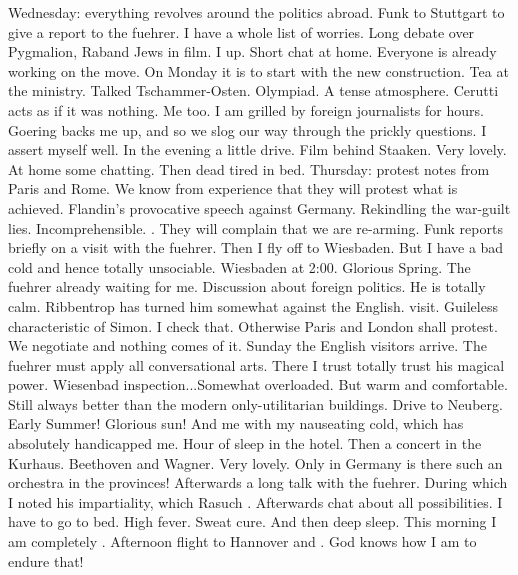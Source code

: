 Wednesday: everything revolves around the politics abroad. Funk to Stuttgart to give a report to the fuehrer. I have a whole list of worries. Long debate over Pygmalion, Rab\missing and Jews in film. I \missing up. Short chat at home. Everyone is already working on the move. On Monday it is to start with the new construction. Tea at the ministry. Talked Tschammer-Osten. Olympiad. A tense atmosphere. Cerutti acts as if it was nothing. Me too. I am grilled by foreign journalists for hours. Goering backs me up, and so we slog our way through the prickly questions. I assert myself well. In the evening a little drive. Film behind Staaken. Very lovely. At home some chatting. Then dead tired in bed.
Thursday: protest notes from Paris and Rome. We know from experience that they will protest what is achieved. Flandin's provocative speech against Germany. Rekindling the war-guilt lies. Incomprehensible. . They will complain that we are re-arming. Funk reports briefly on a visit with the fuehrer. Then I fly off to Wiesbaden. But I have a bad cold and hence totally unsociable. Wiesbaden at 2:00. Glorious Spring. The fuehrer already waiting for me. Discussion about foreign politics. He is totally calm. Ribbentrop has turned him somewhat against the English. visit. Guileless characteristic of Simon. I check that. Otherwise Paris and London shall protest. We negotiate and nothing comes of it. Sunday the English visitors arrive. The fuehrer must apply all conversational arts. There I trust totally trust his magical power. Wiesenbad inspection...Somewhat overloaded. But warm and comfortable. Still always better than the modern only-utilitarian buildings. Drive to Neuberg. Early Summer! Glorious sun! And me with my nauseating cold, which has absolutely handicapped me. Hour of sleep in the hotel. Then a concert in the Kurhaus. Beethoven and Wagner. Very lovely. Only in Germany is there such an orchestra in the provinces! Afterwards a long talk with the fuehrer.  During which I noted his impartiality, which Ra\missing such \missing. Afterwards chat about all possibilities. I have to go to bed. High fever. Sweat cure. And then deep sleep. This morning I am completely . Afternoon flight to Hannover and \missing. God knows how I am to endure that!